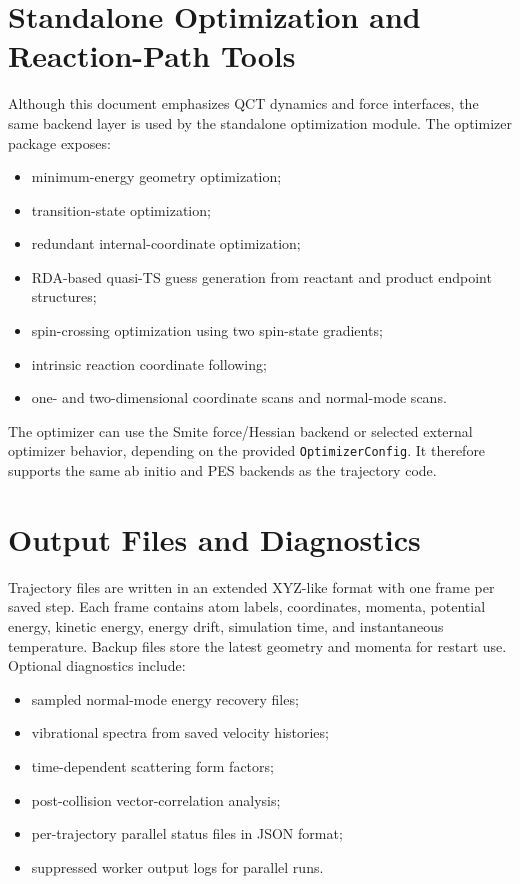 \documentclass[11pt]{article}
\begin{document}
\section{Standalone Optimization and Reaction-Path Tools}

Although this document emphasizes QCT dynamics and force interfaces, the same backend layer is used by the standalone optimization module.  The optimizer package exposes:
\begin{itemize}
  \item minimum-energy geometry optimization;
  \item transition-state optimization;
  \item redundant internal-coordinate optimization;
  \item RDA-based quasi-TS guess generation from reactant and product endpoint structures;
  \item spin-crossing optimization using two spin-state gradients;
  \item intrinsic reaction coordinate following;
  \item one- and two-dimensional coordinate scans and normal-mode scans.
\end{itemize}
The optimizer can use the Smite force/Hessian backend or selected external optimizer behavior, depending on the provided \texttt{OptimizerConfig}.  It therefore supports the same ab initio and PES backends as the trajectory code.

\section{Output Files and Diagnostics}

Trajectory files are written in an extended XYZ-like format with one frame per saved step.  Each frame contains atom labels, coordinates, momenta, potential energy, kinetic energy, energy drift, simulation time, and instantaneous temperature.  Backup files store the latest geometry and momenta for restart use.  Optional diagnostics include:
\begin{itemize}
  \item sampled normal-mode energy recovery files;
  \item vibrational spectra from saved velocity histories;
  \item time-dependent scattering form factors;
  \item post-collision vector-correlation analysis;
  \item per-trajectory parallel status files in JSON format;
  \item suppressed worker output logs for parallel runs.
\end{itemize}
\end{document}
